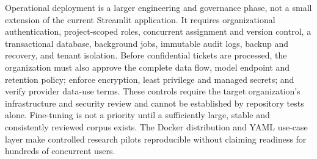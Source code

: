 Operational deployment is a larger engineering and governance phase, not a
small extension of the current Streamlit application. It requires organizational
authentication, project-scoped roles, concurrent assignment and version control,
a transactional database, background jobs, immutable audit logs, backup and
recovery, and tenant isolation. Before confidential tickets are processed, the
organization must also approve the complete data flow, model endpoint and
retention policy; enforce encryption, least privilege and managed secrets; and
verify provider data-use terms. These controls require the target organization's
infrastructure and security review and cannot be established by repository tests
alone. Fine-tuning is not a priority until a sufficiently large, stable and
consistently reviewed corpus exists. The Docker distribution and YAML use-case
layer make controlled research pilots reproducible without claiming readiness
for hundreds of concurrent users.
